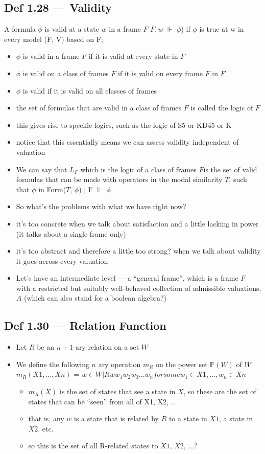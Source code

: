 \documentclass[10pt, a4paper, twoside]{article}
\begin{document}
\subsection{Def 1.28 --- Validity}
A formula $\phi$ is valid at a state $w$ in a frame $F$ $F, w$ $\Vdash$ $\phi$) if $\phi$ is true at w in every model (F, V) based on F;
\begin{itemize}
  \item $\phi$ is valid in a frame $F$ if it is valid at every state in $F$
  \item $\phi$ is valid on a class of frames $F$ if it is valid on every frame $F$ in $F$
  \item $\phi$ is valid if it is valid on all classes of frames
  \item the set of formulas that are valid in a class of frames $F$ is called the logic of $F$
  \item this gives rise to specific logics, such as the logic of S5 or KD45 or K
  \item notice that this essentially means we can assess validity independent of valuation
  \item We can say that $L_F$ which is the logic of a class of frames $F $is the set of valid formulas that can be made with operators in the modal similarity $T$, such that {$\phi$ in Form($T$, $\phi$) | F $\Vdash$ $\phi$}
  \item So what’s the problems with what we have right now?
  \item it’s too concrete when we talk about satisfaction and a little lacking
  in power (it talks about a single frame only)
  \item it’s too abstract and therefore a little too strong? when we talk about validity it goes across every valuation
  \item Let’s have an intermediate level --- a “general frame”, which is a frame $F$ with a restricted but suitably well-behaved collection of admissible valuations, $A$ (which can also stand for a boolean algebra?)
\end{itemize}
\subsection{Def 1.30 --- Relation Function}
\begin{itemize}
  \item Let $R$ be an $n+1$-ary relation on a set $W$
  \item We define the following $n$ ary operation $m_R$ on the power set $\mathbb{P}(W)$ of $W$ $m_R(X1,...,Xn)$ = ${w \in W | Rww_1w_2w_3...w_n for some w_1 \in X1, …, w_n \in Xn}$
  \begin{itemize}
    \item $m_R(X)$ is the set of states that see a state in $X$, so these are the set of states that can be “seen” from all of X1, X2, ...
    \item that is, any $w$ is a state that is related by $R$ to a state in $X1$, a state in $X2$, etc.
    \item so this is the set of all R-related states to $X1$, $X2$, ...?
  \end{itemize}
\end{itemize}
\end{document}
